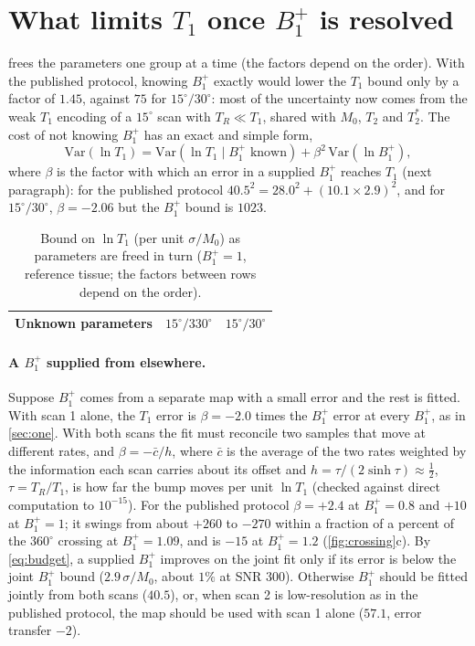 \documentclass[11pt]{article}
\newcommand{\Bone}{B_1^{+}}
\newcommand{\Tone}{T_1}
\newcommand{\Ttwo}{T_2}
\newcommand{\Ttwos}{T_2^{*}}
\newcommand{\Mzero}{M_0}
\newcommand{\TR}{T_R}
\begin{document}
\section{What limits $\Tone$ once $\Bone$ is resolved}\label{sec:t1}

 frees the parameters one group at a time (the factors depend on the order). With
the published protocol, knowing $\Bone$ exactly would lower the $\Tone$ bound only by a factor of $1.45$,
against $75$ for $15^\circ/30^\circ$: most of the uncertainty now comes from the weak $\Tone$ encoding of a $15^\circ$
scan with $\TR\ll\Tone$, shared with $\Mzero$, $\Ttwo$ and $\Ttwos$. The cost of not knowing $\Bone$ has an exact and simple
form,
\begin{equation}
  \mathrm{Var}(\ln\Tone)=\mathrm{Var}(\ln\Tone\mid\Bone\text{ known})+\beta^2\,\mathrm{Var}(\ln\Bone),
  \label{eq:budget}
\end{equation}
where $\beta$ is the factor with which an error in a supplied $\Bone$ reaches $\Tone$ (next paragraph): for the
published protocol $40.5^2=28.0^2+(10.1\times2.9)^2$, and for $15^\circ/30^\circ$, $\beta=-2.06$ but the $\Bone$ bound is $1023$.

\begin{table}[!tb]
\centering
\caption{Bound on $\ln\Tone$ (per unit $\sigma/\Mzero$) as parameters are freed in turn ($\Bone=1$, reference tissue;
the factors between rows depend on the order).}
\label{tab:budget}
\small
\begin{tabular}{lcc}
\toprule
Unknown parameters & $15^\circ/330^\circ$ & $15^\circ/30^\circ$\\
\midrule

\bottomrule
\end{tabular}
\end{table}

\paragraph{A $\Bone$ supplied from elsewhere.} Suppose $\Bone$ comes from a separate map with a small error
and the rest is fitted. With scan 1 alone, the $\Tone$ error is $\beta=-2.0$ times the $\Bone$ error at every $\Bone$,
as in \cref{sec:one}. With both scans the fit must reconcile two samples that move at different
rates, and $\beta=-\bar c/h$, where $\bar c$ is the average of the two rates weighted by the information each
scan carries about its offset and $h=\tau/(2\sinh\tau)\approx\tfrac12$, $\tau=\TR/\Tone$, is how far the bump moves per unit
$\ln\Tone$ (checked against direct computation to $10^{-15}$). For the published protocol $\beta=+2.4$ at
$\Bone=0.8$ and $+10$ at $\Bone=1$; it swings from about $+260$ to $-270$ within a fraction of a percent of the
$360^\circ$ crossing at $\Bone=1.09$, and is $-15$ at $\Bone=1.2$ (\cref{fig:crossing}c). By \eqref{eq:budget}, a supplied
$\Bone$ improves on the joint fit only if its error is below the joint $\Bone$ bound ($2.9\,\sigma/\Mzero$, about $1\%$ at
SNR 300). Otherwise $\Bone$ should be fitted jointly from both scans ($40.5$), or, when scan 2 is
low-resolution as in the published protocol, the map should be used with scan 1 alone ($57.1$,
error transfer $-2$).
\end{document}
